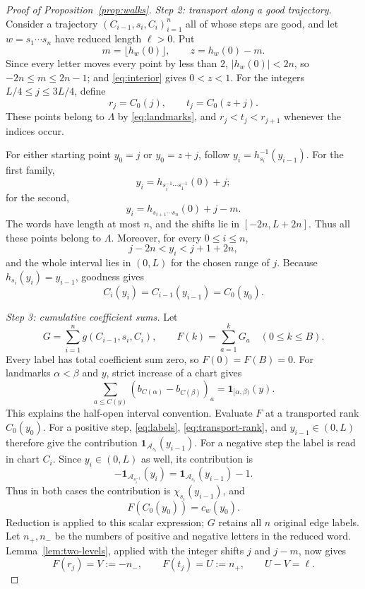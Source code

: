 \documentclass[11pt]{article}
\theoremstyle{definition}
\theoremstyle{remark}
\newcommand{\one}{\mathbf 1}
\newcommand{\cA}{\mathcal A}
\begin{document}
\begin{proof}[Proof of Proposition~\ref{prop:walks}]
\par\smallskip
{}
\noindent\emph{Step 2: transport along a good trajectory.}
Consider a trajectory $(C_{i-1},s_i,C_i)_{i=1}^n$ all of whose steps
are good, and let $w=s_1\cdots s_n$ have reduced length $\ell>0$.
Put
\[
 m=\lfloor h_w(0)\rfloor,\qquad z=h_w(0)-m.
\]
Since every letter moves every point by less than $2$, $|h_w(0)|<2n$,
so $-2n\leq m\leq2n-1$; and \eqref{eq:interior} gives $0<z<1$.
For the integers $L/4\leq j\leq3L/4$, define
\begin{equation}\label{eq:rank-pairs}
 r_j=C_0(j),\qquad t_j=C_0(z+j).
\end{equation}
These points belong to $\Lambda$ by \eqref{eq:landmarks}, and
$r_j<t_j<r_{j+1}$ whenever the indices occur.

For either starting point $y_0=j$ or $y_0=z+j$, follow
$y_i=h_{s_i}^{-1}(y_{i-1})$.
For the first family,
\[
 y_i=h_{s_i^{-1}\cdots s_1^{-1}}(0)+j;
\]
for the second,
\[
 y_i=h_{s_{i+1}\cdots s_n}(0)+j-m.
\]
The words have length at most $n$, and the shifts lie in
$[-2n,L+2n]$. Thus all these points belong to $\Lambda$.
Moreover, for every $0\leq i\leq n$,
\begin{equation}\label{eq:transport-bounds}
 j-2n<y_i<j+1+2n,
\end{equation}
and the whole interval lies in $(0,L)$ for the chosen range of $j$.
Because $h_{s_i}(y_i)=y_{i-1}$, goodness gives
\begin{equation}\label{eq:transport-rank}
 C_i(y_i)=C_{i-1}(y_{i-1})=C_0(y_0).
\end{equation}

\par\smallskip
{}
\noindent\emph{Step 3: cumulative coefficient sums.}
Let
\[
 G=\sum_{i=1}^n g(C_{i-1},s_i,C_i),\qquad
 F(k)=\sum_{a=1}^k G_a\quad(0\leq k\leq B).
\]
Every label has total coefficient sum zero, so $F(0)=F(B)=0$.
For landmarks $\alpha<\beta$ and $y$, strict increase of a chart gives
\[
 \sum_{a\leq C(y)}(b_{C(\alpha)}-b_{C(\beta)})_a
 =\one_{[\alpha,\beta)}(y).
\]
This explains the half-open interval convention.
Evaluate $F$ at a transported rank $C_0(y_0)$.
For a positive step, \eqref{eq:labels}, \eqref{eq:transport-rank},
and $y_{i-1}\in(0,L)$ therefore give the contribution
$\one_{\cA_{s_i}}(y_{i-1})$.
For a negative step the label is read in chart $C_i$. Since $y_i\in(0,L)$
as well, its contribution is
\[
 -\one_{\cA_{s_i^{-1}}}(y_i)
 =\one_{\cA_{s_i}}(y_{i-1})-1.
\]
Thus in both cases the contribution is $\chi_{s_i}(y_{i-1})$, and
\begin{equation}\label{eq:F-cocycle}
 F(C_0(y_0))=c_w(y_0).
\end{equation}
Reduction is applied to this scalar expression; $G$ retains all $n$
original edge labels.
Let $n_+,n_-$ be the numbers of positive and negative letters in the
reduced word. Lemma~\ref{lem:two-levels}, applied with the integer shifts
$j$ and $j-m$, now gives
\begin{equation}\label{eq:F-levels}
 F(r_j)=V:=-n_-,\qquad F(t_j)=U:=n_+,
 \qquad U-V=\ell.
\end{equation}


\end{proof}
\end{document}
